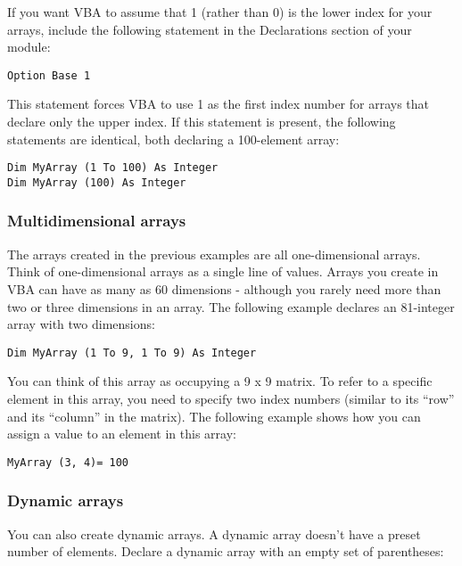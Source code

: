 \documentclass[
]{article}
\theoremstyle{definition}
\theoremstyle{definition}
\theoremstyle{definition}
\theoremstyle{definition}
\theoremstyle{remark}
\begin{document}
If you want VBA to assume that 1 (rather than 0) is the lower index for your arrays, include the following statement in the Declarations section of your module:

\begin{verbatim}
Option Base 1
\end{verbatim}

This statement forces VBA to use 1 as the first index number for arrays that declare only the upper index. If this statement is present, the following statements are identical, both declaring a 100-element array:

\begin{verbatim}
Dim MyArray (1 To 100) As Integer
Dim MyArray (100) As Integer
\end{verbatim}

\hypertarget{multidimensional-arrays}{%
\subsubsection{Multidimensional arrays}\label{multidimensional-arrays}}

The arrays created in the previous examples are all one-dimensional arrays. Think of one-dimensional arrays as a single line of values. Arrays you create in VBA can have as many as 60 dimensions - although
you rarely need more than two or three dimensions in an array. The following example declares an 81-integer array with two dimensions:

\begin{verbatim}
Dim MyArray (1 To 9, 1 To 9) As Integer
\end{verbatim}

You can think of this array as occupying a 9 x 9 matrix. To refer to a
specific element in this array, you need to specify two index numbers
(similar to its ``row'' and its ``column'' in the matrix). The
following example shows how you can assign a value to an element in this
array:

\begin{verbatim}
MyArray (3, 4)= 100
\end{verbatim}

\hypertarget{dynamic-arrays}{%
\subsubsection{Dynamic arrays}\label{dynamic-arrays}}

You can also create dynamic arrays. A dynamic array doesn't have a preset number of elements. Declare a dynamic array with an empty set of parentheses:
\end{document}

